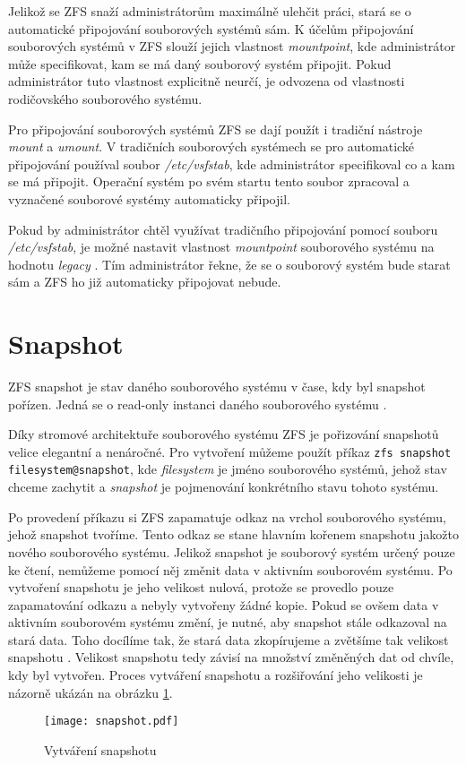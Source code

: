 Jelikož se ZFS snaží administrátorům maximálně ulehčit práci, stará se o automatické připojování souborových systémů sám. K účelům připojování souborových systémů v ZFS slouží jejich vlastnost \emph{mountpoint}, kde administrátor může specifikovat, kam se má daný souborový systém připojit. Pokud administrátor tuto vlastnost explicitně neurčí, je odvozena od vlastnosti rodičovského souborového systému.

Pro připojování souborových systémů ZFS se dají použít i tradiční nástroje \emph{mount} a \emph{umount}. V tradičních souborových systémech se pro automatické připojování používal soubor \emph{/etc/vsfstab}, kde administrátor specifikoval co a kam se má připojit. Operační systém po svém startu tento soubor zpracoval a vyznačené souborové systémy automaticky připojil.

Pokud by administrátor chtěl využívat tradičního připojování pomocí souboru \emph{/etc/vsfstab}, je možné nastavit vlastnost \emph{mountpoint} souborového systému na hodnotu \emph{legacy} \cite{mountpoint}. Tím administrátor řekne, že se o souborový systém bude starat sám a ZFS ho již automaticky připojovat nebude.
\section{Snapshot}
\label{snapshot}
ZFS snapshot je stav daného souborového systému v čase, kdy byl snapshot pořízen. Jedná se o read-only instanci daného souborového systému \cite{snapshot}.

Díky stromové architektuře souborového systému ZFS je pořizování snapshotů velice elegantní a nenáročné. Pro vytvoření můžeme použít příkaz \verb|zfs snapshot filesystem@snapshot|, kde \emph{filesystem} je jméno souborového systémů, jehož stav chceme zachytit a \emph{snapshot} je pojmenování konkrétního stavu tohoto systému.

Po provedení příkazu si ZFS zapamatuje odkaz na vrchol souborového systému, jehož snapshot tvoříme. Tento odkaz se stane hlavním kořenem snapshotu jakožto nového souborového systému. Jelikož snapshot je souborový systém určený pouze ke čtení, nemůžeme pomocí něj změnit data v aktivním souborovém systému. Po vytvoření snapshotu je jeho velikost nulová, protože se provedlo pouze zapamatování odkazu a nebyly vytvořeny žádné kopie. Pokud se ovšem data v aktivním souborovém systému změní, je nutné, aby snapshot stále odkazoval na stará data. Toho docílíme tak, že stará data zkopírujeme a zvětšíme tak velikost snapshotu \cite{snapshot}. Velikost snapshotu tedy závisí na množství změněných dat od chvíle, kdy byl vytvořen. Proces vytváření snapshotu a rozšiřování jeho velikosti je názorně ukázán na obrázku \ref{snapshotproces}.
\begin{figure}
    \centering
    \texttt{[image: snapshot.pdf]}
    \caption{Vytváření snapshotu}
    \label{snapshotproces}
\end{figure}

